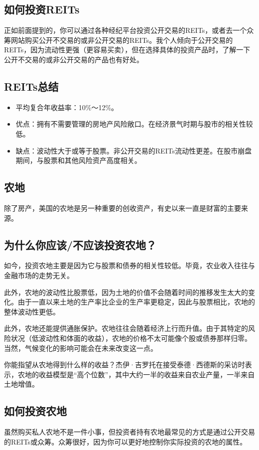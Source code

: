 \subsection{如何投资REITs}
正如前面提到的，你可以通过各种经纪平台投资公开交易的REITs，或者去一个众筹网站购买公开不交易的或非公开交易的REITs。我个人倾向于公开交易的REITs，因为流动性更强（更容易买卖），但在选择具体的投资产品时，了解一下公开不交易的或非公开交易的产品也有好处。

\subsection{REITs总结}
\begin{itemize}
\item 平均复合年收益率：10\%～12\%。
\item 优点：拥有不需要管理的房地产风险敞口。在经济景气时期与股市的相关性较低。
\item 缺点：波动性大于或等于股票。非公开交易的REITs流动性更差。在股市崩盘期间，与股票和其他风险资产高度相关。
\end{itemize}
\subsection{农地}
除了房产，美国的农地是另一种重要的创收资产，有史以来一直是财富的主要来源。

\subsection{为什么你应该/不应该投资农地？}
如今，投资农地主要是因为它与股票和债券的相关性较低。毕竟，农业收入往往与金融市场的走势无关。

此外，农地的波动性比股票低，因为土地的价值不会随着时间的推移发生太大的变化。由于一直以来土地的生产率比企业的生产率更稳定，因此与股票相比，农地的整体波动性更低。

此外，农地还能提供通胀保护。农地往往会随着经济上行而升值。由于其特定的风险状况（低波动性和体面的收益），农地的价格不太可能像个股或债券那样归零。当然，气候变化的影响可能会在未来改变这一点。

你能指望从农地得到什么样的收益？杰伊·吉罗托在接受泰德·西德斯的采访时表示，农地的收益模型是“高个位数”，其中大约一半的收益来自农业产量，一半来自土地增值。

\subsection{如何投资农地}
虽然购买私人农地不是一件小事，但投资者持有农地最常见的方式是通过公开交易的REITs或众筹。众筹很好，因为你可以更好地控制你实际投资的农地的属性。

